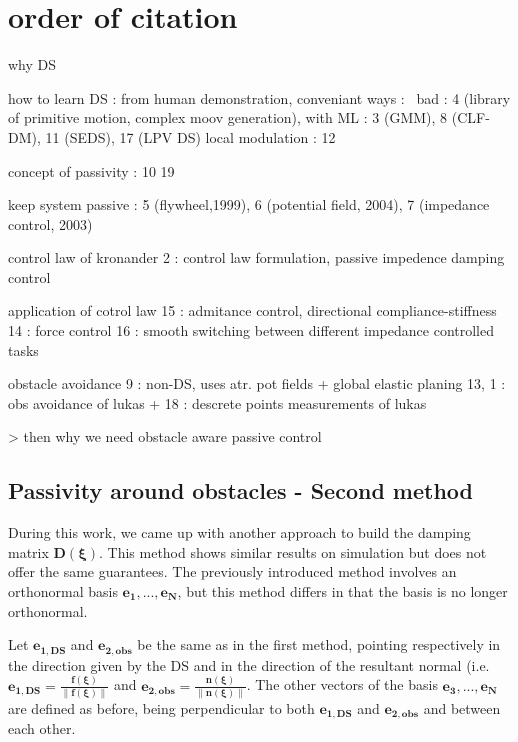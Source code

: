 \section{order of citation}

why DS

how to learn DS : 
from human demonstration, conveniant ways : 
    ~bad : 4 (library of primitive motion, complex moov generation),
    with ML : 3 (GMM), 8 (CLF-DM), 11 (SEDS), 17 (LPV DS)
    local modulation : 12 

concept of passivity :
10 19

keep system passive : 
5 (flywheel,1999), 6 (potential field, 2004), 7 (impedance control, 2003)

control law of kronander
2 : control law formulation, passive impedence damping control

application of cotrol law
15 : admitance control, directional compliance-stiffness 
14 : force control
16 : smooth switching between different impedance controlled tasks


obstacle avoidance
9 : non-DS, uses atr. pot fields + global elastic planing
13, 1 : obs avoidance of lukas + 
18 : descrete points measurements of lukas

> then why we need obstacle aware passive control

\appendix
\subsection{Passivity around obstacles - Second method}
During this work, we came up with another approach to build the damping matrix $\boldsymbol D(\boldsymbol\xi)$. This method shows similar results on simulation but does not offer the same guarantees. The previously introduced method involves an orthonormal basis $\boldsymbol{e_1}, ..., \boldsymbol{e_N}$, but this method differs in that the basis is no longer orthonormal.

Let $\boldsymbol{e_{1,DS}}$ and $\boldsymbol{e_{2,obs}}$ be the same as in the first method, pointing respectively in the direction given by the DS and in the direction of the resultant normal (i.e. $\boldsymbol{e_{1,DS}} = \frac{\boldsymbol f(\boldsymbol\xi)}{\lVert \boldsymbol f(\boldsymbol\xi)\rVert}$ and $\boldsymbol{e_{2,obs}} = \frac{\boldsymbol n(\boldsymbol \xi)}{\lVert \boldsymbol n(\boldsymbol\xi)\rVert}$. The other vectors of the basis $\boldsymbol{e_3}, ... ,\boldsymbol{e_N}$ are defined as before, being perpendicular to both $\boldsymbol{e_{1,DS}}$ and $\boldsymbol{e_{2, obs}}$ and between each other. 

